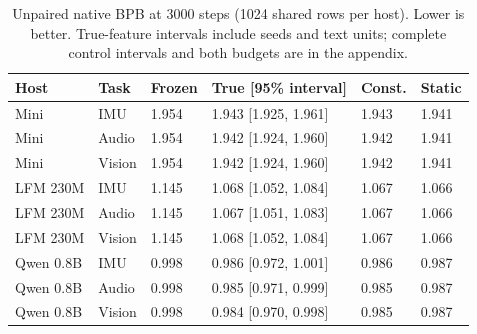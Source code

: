 \begin{table}[!htbp]\centering\small
\setlength{\tabcolsep}{4pt}
\caption{Unpaired native BPB at 3000 steps (1024 shared rows per host). Lower is better. True-feature intervals include seeds and text units; complete control intervals and both budgets are in the appendix.}\label{tab:bpb}
\begin{tabular}{@{}llllll@{}}
\toprule
Host & Task & Frozen & True [95\% interval] & Const. & Static \\
\midrule
Mini & IMU & 1.954 & 1.943 [1.925, 1.961] & 1.943 & 1.941 \\
Mini & Audio & 1.954 & 1.942 [1.924, 1.960] & 1.942 & 1.941 \\
Mini & Vision & 1.954 & 1.942 [1.924, 1.960] & 1.942 & 1.941 \\
LFM 230M & IMU & 1.145 & 1.068 [1.052, 1.084] & 1.067 & 1.066 \\
LFM 230M & Audio & 1.145 & 1.067 [1.051, 1.083] & 1.067 & 1.066 \\
LFM 230M & Vision & 1.145 & 1.068 [1.052, 1.084] & 1.067 & 1.066 \\
Qwen 0.8B & IMU & 0.998 & 0.986 [0.972, 1.001] & 0.986 & 0.987 \\
Qwen 0.8B & Audio & 0.998 & 0.985 [0.971, 0.999] & 0.985 & 0.987 \\
Qwen 0.8B & Vision & 0.998 & 0.984 [0.970, 0.998] & 0.985 & 0.987 \\
\bottomrule
\end{tabular}
\end{table}\par
